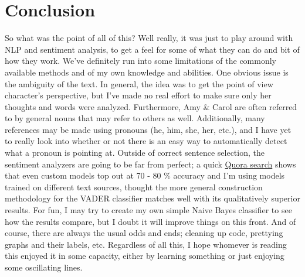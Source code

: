 \documentclass[11pt]{article}
\begin{document}
\section{Conclusion}
\noindent
So what was the point of all of this? Well really, it was just to play around with NLP and sentiment analysis, to get a feel for some of what they can do and bit of how they work. We've definitely run into some limitations of the commonly available methods and of my own knowledge and abilities. One obvious issue is the ambiguity of the text. In general, the idea was to get the point of view character's perspective, but I've made no real effort to make sure only her thoughts and words were analyzed. Furthermore, Amy \& Carol are often referred to by general nouns that may refer to others as well. Additionally, many references may be made using pronouns (he, him, she, her, etc.), and I have yet to really look into whether or not there is an easy way to automatically detect what a pronoun is pointing at. Outside of correct sentence selection, the sentiment analyzers are going to be far from perfect; a quick \href{https://www.quora.com/What-is-the-accepted-accuracy-of-sentiment-analysis}{Quora search} shows that even custom models top out at 70 - 80 \% accuracy and I'm using models trained on different text sources, thought the more general construction methodology for the VADER classifier matches well with its qualitatively superior results. For fun, I may try to create my own simple Naive Bayes classifier to see how the results compare, but I doubt it will improve things on this front. And of course, there are always the usual odds and ends; cleaning up code, prettying graphs and their labels, etc. Regardless of all this, I hope whomever is reading this enjoyed it in some capacity, either by learning something or just enjoying some oscillating lines. 
\end{document}
